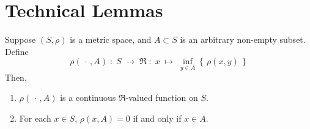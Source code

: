 

\section{Technical Lemmas}
\setcounter{theorem}{0}
\setcounter{equation}{0}

\renewcommand{\theenumi}{\roman{enumi}}
\renewcommand{\labelenumi}{\textnormal{(\theenumi)}$\;\;$}

\begin{lemma}\label{LemmaRho}
\quad
Suppose $\left(S,\rho\right)$ is a metric space, and $A \subset S$ is an arbitrary non-empty subset.
Define
\begin{equation*}
\rho(\,\cdot\,,A) \;:\; S \;\longrightarrow\; \Re \;:\; x \;\longmapsto\; \inf_{y\in A}\left\{\,\rho(x,y)\,\right\}
\end{equation*}
Then,
\begin{enumerate}
\item	$\rho(\,\cdot\,,A)$ is a continuous $\Re$-valued function on $S$.
\item	For each $x \in S$, $\rho(x,A) = 0$ if and only if $x \in \overline{A}$.
\end{enumerate}
\end{lemma}
\proof
